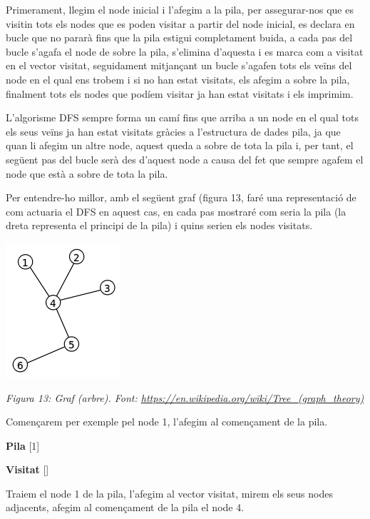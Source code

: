 Primerament, llegim el node inicial i l'afegim a la pila, per assegurar-nos que es visitin tots els nodes que es poden visitar a partir del node inicial, es declara en bucle que no pararà fins que la pila estigui completament buida, a cada pas del bucle s'agafa el node de sobre la pila, s'elimina d'aquesta i es marca com a visitat en el vector visitat, seguidament mitjançant un bucle s'agafen tots els veïns del node en el qual ens trobem i si no han estat visitats, els afegim a sobre la pila, finalment tots els nodes que podíem visitar ja han estat visitats i els imprimim.

L'algorisme DFS sempre forma un camí fins que arriba a un node en el qual tots els seus veïns ja han estat visitats gràcies a l'estructura de dades pila, ja que quan li afegim un altre node, aquest queda a sobre de tota la pila i, per tant, el següent pas del bucle serà des d'aquest node a causa del fet que sempre agafem el node que està a sobre de tota la pila.

Per entendre-ho millor, amb el següent graf (figura 13, faré una representació de com actuaria el DFS en aquest cas, en cada pas mostraré com seria la pila (la dreta representa el principi de la pila) i quins serien els nodes visitats.

\begin{center}
    \includegraphics[width=.4 \textwidth]{tree.png}
    
    \caption{\emph{Figura 13: Graf (arbre). Font: \url{https://en.wikipedia.org/wiki/Tree_(graph_theory)}}}
\end{center}

Començarem per exemple pel node 1, l'afegim al començament de la pila. \newline

\textbf{Pila} [1]

\textbf{Visitat} [] \newline

Traiem el node 1 de la pila, l'afegim al vector visitat, mirem els seus nodes adjacents, afegim al començament de la pila el node 4. \newline

